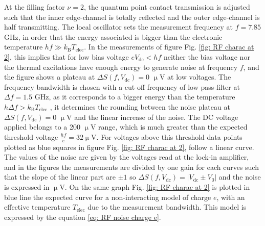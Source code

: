 At the filling factor $\nu = 2$, the quantum point contact transmission is adjusted such that the inner edge-channel is totally reflected and the outer edge-channel is half transmitting.
The local oscillator sets the measurement frequency at $f = 7.85$ GHz, in order that the energy associated is bigger than the electronic temperature $hf \gg k_{\mathrm{B}}T_{\mathrm{elec}}$.
In the measurements of figure Fig. \ref{fig: RF charac at 2}, this implies that for low bias voltage $eV_{\mathrm{dc}} < hf$ neither the bias voltage nor the thermal excitations have enough energy to generate noise at frequency $f$, and the figure shows a plateau at $\Delta S\left(f,V_{\mathrm{dc}}\right) = 0$ $\upmu$V at low voltages.
The frequency bandwidth is chosen with a cut-off frequency of low pass-filter at $\Delta f = 1.5$ GHz, as it corresponds to a bigger energy than the temperature $h\Delta f > k_{\mathrm{B}}T_{\mathrm{elec}}$ , it determines the rounding between the noise plateau at $\Delta S\left(f,V_{\mathrm{dc}}\right) = 0$ $\upmu$V and the linear increase of the noise.
The DC voltage applied belongs to a 200 $\upmu$V range, which is much greater than the expected threshold voltage $\frac{hf}{e} = 32 \upmu$V.
For voltages above this threshold data points plotted as blue squares in figure Fig. \ref{fig: RF charac at 2}, follow a linear curve.
The values of the noise are given by the voltages read at the lock-in amplifier, and in the figures the measurements are divided by one gain for each curves such that the slope of the linear part are $\pm1$ so $\Delta S \left(f,V_{\mathrm{dc}}\right) = \left|V_{\mathrm{dc}} \pm V_{0}\right|$ and the noise is expressed in $\upmu$V.
On the same graph Fig. \ref{fig: RF charac at 2} is plotted in blue line the expected curve for a non-interacting model \cite{blanter2000shot,martin2005course} of charge $e$, with an effective temperature $T_{\mathrm{elec}}$ due to the measurement bandwidth.
This model is expressed by the equation \eqref{eq: RF noise charge e}.

